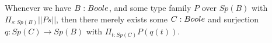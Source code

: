 
\begin{axiom}\label{AxLocalChoice}
  Whenever we have $B:\Boole$, and some type family $P$ over $Sp(B)$ with 
  $\Pi_{s:Sp(B)} ||P s||$, then there 
  merely exists some $C:\Boole$ and surjection $q:Sp(C)\to Sp(B)$ with 
$  \Pi_{t:Sp(C)} P(q(t))$.
\end{axiom}

